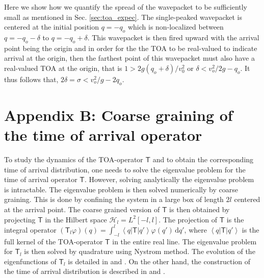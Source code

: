 \documentclass[%
 reprint,
 amsmath,amssymb,
 aps,
]{revtex4-1}
\newcommand{\opr}[1]{\ensuremath{\mathbf{\mathsf{#1}}}}
\begin{document}
Here we show how we quantify the spread of the wavepacket to be sufficiently small as mentioned in Sec. \ref{sec:toa_expec}. The single-peaked wavepacket is centered at the initial position $q=-q_o$ which is non-localized between $q=-q_o-\delta$ to $q=-q_o+\delta$. This wavepacket is then fired upward with the arrival point being the origin and in order for the the TOA to be real-valued to indicate arrival at the origin, then the farthest point of this wavepacket must also have a real-valued TOA at the origin, that is
$1 >2g(q_o+\delta)/v_0^2$ or 
$\delta < v_o^2/2g-q_o$.
It thus follows that, 
$2\delta = \sigma <  v_o^2/g-2q_o$.

\section*{Appendix B: Coarse graining of the time of arrival operator} To study the dynamics of the TOA-operator $\opr{T}$ and to obtain the corresponding time of arrival distribution, one needs to solve the eigenvalue problem for the time of arrival operator $\opr{T}$. However, solving analytically the eigenvalue problem is intractable. The eigenvalue problem is then solved numerically by coarse graining. This is done by confining the system in a large box of length $2l$ centered at the arrival point. The coarse grained version of $\opr{T}$ is then obtained by projecting $\opr{T}$ in the Hilbert space $\mathcal{H}_l=L^2[-l,l]$. The projection of $\opr{T}$ is the integral operator $(\opr{T}_l\varphi)(q)=\int_{-l}^l \left<q|\opr{T}|q'\right>\varphi(q')\,\mathrm{d}q'$, where $\left<q|\opr{T}|q'\right>$ is the full kernel of the TOA-operator $\opr{T}$ in the entire real line. The eigenvalue problem for  $\opr{T}_l$ is then solved by quadrature using Nystrom method. The evolution of the eigenfunctions of $\opr{T}_l$ is detailed in  \cite{jaykel} and \cite{IJMPA}. On the other hand, the construction of the time of arrival distribution is described in  \cite{G2009PRSA} and \cite{toa1}.
\end{document}
